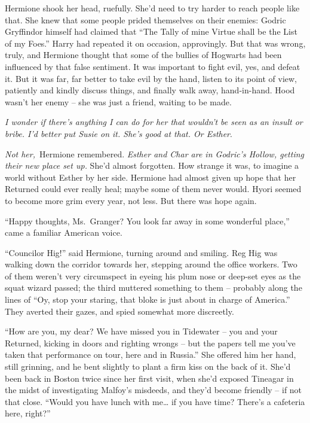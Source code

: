 Hermione shook her head, ruefully. She'd need to try harder to reach
people like that. She knew that some people prided themselves on their
enemies: Godric Gryffindor himself had claimed that ``The Tally of mine
Virtue shall be the List of my Foes.'' Harry had repeated it on
occasion, approvingly. But that was wrong, truly, and Hermione thought
that some of the bullies of Hogwarts had been influenced by that false
sentiment. It was important to fight evil, yes, and defeat it. But it
was far, far better to take evil by the hand, listen to its point of
view, patiently and kindly discuss things, and finally walk away,
hand-in-hand. Hood wasn't her enemy -- she was just a friend, waiting to
be made.

\emph{I wonder if there's anything I can do for her that wouldn't be
seen as an insult or bribe. I'd better put Susie on it. She's good at
that. Or Esther}.

\emph{Not her,}~Hermione remembered. \emph{Esther and Char are in
Godric's Hollow, getting their new place set up.} She'd almost
forgotten. How strange it was, to imagine a world without Esther by her
side. Hermione had almost given up hope that her Returned could ever
really heal; maybe some of them never would. Hyori seemed to become more
grim every year, not less. But there was hope again.

``Happy thoughts, Ms.~Granger? You look far away in some wonderful
place,'' came a familiar American voice.

``Councilor Hig!'' said Hermione, turning around and smiling. Reg Hig
was walking down the corridor towards her, stepping around the office
workers. Two of them weren't very circumspect in eyeing his plum nose or
deep-set eyes as the squat wizard passed; the third muttered something
to them -- probably along the lines of ``Oy, stop your staring, that
bloke is just about in charge of America.'' They averted their gazes,
and spied somewhat more discreetly.

``How are you, my dear? We have missed you in Tidewater -- you and your
Returned, kicking in doors and righting wrongs -- but the papers tell me
you've taken that performance on tour, here and in Russia.'' She offered
him her hand, still grinning, and he bent slightly to plant a firm kiss
on the back of it. She'd been back in Boston twice since her first
visit, when she'd exposed Tineagar in the midst of investigating
Malfoy's misdeeds, and they'd become friendly -- if not that close.
``Would you have lunch with me\ldots{} if you have time? There's a
cafeteria here, right?''

